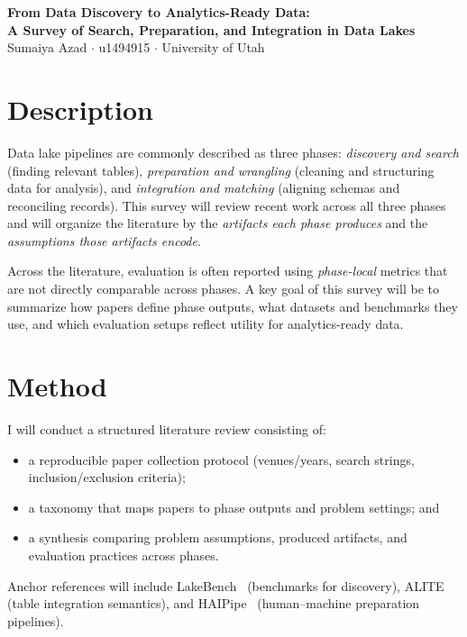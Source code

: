 \documentclass[11pt]{article}
\begin{document}
\begin{center}
{\Large\bfseries From Data Discovery to Analytics-Ready Data:\\
A Survey of Search, Preparation, and Integration in Data Lakes}\\[7pt]
{\normalsize Sumaiya Azad \quad $\cdot$ \quad u1494915 \quad $\cdot$ \quad University of Utah}
\end{center}

\vspace{2pt}

\section{Description}
Data lake pipelines are commonly described as three phases:
\emph{discovery and search} (finding relevant tables),
\emph{preparation and wrangling} (cleaning and structuring data for analysis),
and \emph{integration and matching} (aligning schemas and reconciling records).
This survey will review recent work across all three phases and will organize the literature by the
\emph{artifacts each phase produces} and the \emph{assumptions those artifacts encode}.

Across the literature, evaluation is often reported using \emph{phase-local} metrics that are not directly comparable across phases.
A key goal of this survey will be to summarize how papers define phase outputs, what datasets and benchmarks they use,
and which evaluation setups reflect utility for analytics-ready data.

\section{Method}
I will conduct a structured literature review consisting of:
\begin{itemize}
  \item a reproducible paper collection protocol (venues/years, search strings, inclusion/exclusion criteria);
  \item a taxonomy that maps papers to phase outputs and problem settings; and
  \item a synthesis comparing problem assumptions, produced artifacts, and evaluation practices across phases.
\end{itemize}

Anchor references will include 
LakeBench~\cite{10.14778/3659437.3659448} (benchmarks for discovery),
ALITE~\cite{10.14778/3574245.3574274} (table integration semantics),
and HAIPipe~\cite{10.1145/3588945} (human--machine preparation pipelines).
\end{document}
